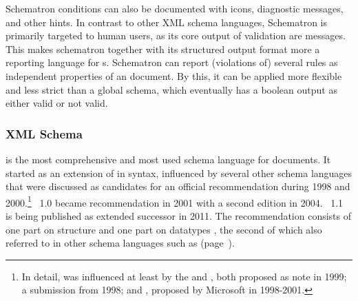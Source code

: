 Schematron conditions can also be documented with icons, diagnostic messages,
and other hints.  In contrast to other XML schema languages, Schematron is
primarily targeted to human users, as its core output of validation are
messages. This makes schematron together with its structured output format
 more a reporting language
for s.  Schematron can report (violations of) several rules
as independent properties of an  document.  By this, it can be
applied more flexible and less strict than a global schema, which eventually
has a boolean output as either valid or not valid.

\subsubsection{XML Schema}
\label{sec:xmlschema}

 is the most comprehensive and most used schema language
for  documents. It started as an extension of  in
 syntax, influenced by several other schema languages that were
discussed as candidates for an official  recommendation during 1998
and 2000.\footnote{In detail,  was influenced at least by the
 and , both proposed as  note in 1999;
 a  submission from 1998;
and , proposed by Microsoft in 1998-2001.}
~1.0 became  recommendation in 2001 with a second edition
in 2004. ~1.1 is being published as extended successor in 2011. The
recommendation consists of one part on structure \cite{Thompson2004} and one
part on datatypes \cite{Biron2004}, the second of which also referred to in
other schema languages such as  (page~\pageref{sec:rdfschemas}).


